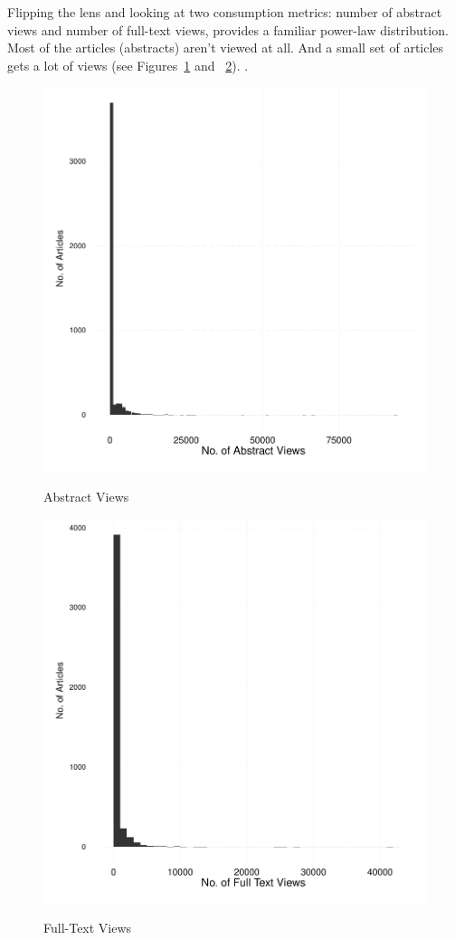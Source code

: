 \documentclass[11pt]{article}
\begin{document}
Flipping the lens and looking at two consumption metrics: number of abstract views and number of full-text views, provides a familiar power-law distribution. Most of the articles (abstracts) aren't viewed at all. And a small set of articles gets a lot of views (see Figures~\ref{fig:abstracts} and ~\ref{fig:fulltext}). .

\begin{figure}[htbp]
\centering
\caption{Abstract Views}
\includegraphics[scale=.85]{../figs/abstract_views.pdf}
\label{fig:abstracts}
\end{figure}

\begin{figure}[htbp]
\centering
\caption{Full-Text Views}
\includegraphics[scale=.85]{../figs/fulltext_views.pdf}
\label{fig:fulltext}
\end{figure}

\clearpage


\end{document}
